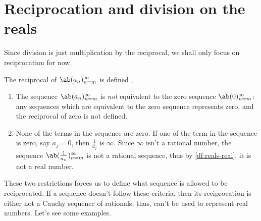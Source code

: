 \section{Reciprocation and division on the reals}

Since division is just multiplication by the reciprocal, we shall only focus on
reciprocation for now.

The reciprocal of $\sequence{a_n}{n = m}{\infty}$ is defined \ifft,
\begin{enumerate}
  \item The sequence $\sequence{a_n}{n = m}{\infty}$ is \emph{not} equivalent to the
        zero sequence $\sequence{0}{n = m}{\infty}$: any sequences which are equivalent
        to the zero sequence represents zero, and the reciprocal of zero is not defined.
  \item None of the terms in the sequence are zero. If one of the term in the sequence
        is zero, say $a_j = 0$, then $\frac{1}{a_j}$ is $\infty$. Since $\infty$ isn't
        a rational number, the sequence $\sequence{\frac{1}{a_n}}{n = m}{\infty}$ is
        not a rational sequence, thus by \cref{df:reals-real}, it is not a real number.
\end{enumerate}
These two restrictions forces us to define what sequence is allowed to be reciprocated.
If a sequence doesn't follow these criteria, then its reciprocation is either not a Cauchy
sequence of rationals; thus, can't be used to represent real numbers. Let's see some examples.
